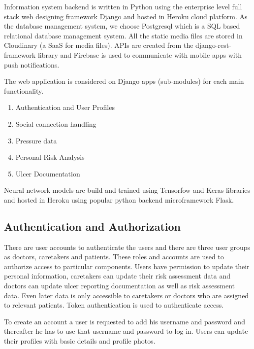 Information system backend is written in Python using the enterprise level full stack web designing framework Django\textsuperscript{\textregistered} and hosted in Heroku\textsuperscript{\textregistered} cloud platform. As the database management system, we choose Postgresql which is a SQL based relational database management system. All the static media files are stored in Cloudinary \textsuperscript{\textregistered} (a SaaS for media files). APIs are created from the django-rest-framework library and Firebase\textsuperscript{\textregistered} is used to communicate with mobile apps with push notifications. 

The web application is considered on Django apps (sub-modules) for each main functionality.
\begin{enumerate}
	\item Authentication and User Profiles
	\item Social connection handling
	\item Pressure data
	\item Personal Risk Analysis
	\item Ulcer Documentation
\end{enumerate}

Neural network models are build and trained using Tensorfow\textsuperscript{\textregistered} and Keras\textsuperscript{\textregistered} libraries and hosted in Heroku\textsuperscript{\textregistered} using popular python backend microframework Flask\textsuperscript{\textregistered}.


\subsection{Authentication and Authorization}

There are user accounts to authenticate the users and there are three user groups as doctors, caretakers and patients. These roles and accounts are used to authorize access to particular components. Users have permission to update their personal information, caretakers can update their risk assessment data and doctors can update ulcer reporting documentation as well as risk assessment data. Even later data is only accessible to caretakers or doctors who are assigned to relevant patients. Token authentication is used to authenticate access.

To create an account a user is requested to add his username and password and thereafter he has to use that username and password to log in. Users can update their profiles with basic details and profile photos.

